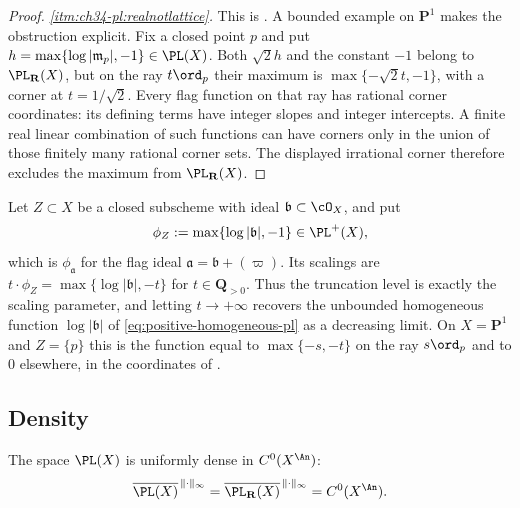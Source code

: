 \begin{proof}
\emph{\cref{itm:ch34-pl:realnotlattice}.}  This is
\cite[Remark~2.4]{BJ22}.  A bounded example on $\mathbf P^1$ makes the
obstruction explicit.  Fix a closed point $p$ and put
$h=\max\{\log|\mathfrak m_p|,-1\}\in\PL(X)$.
Both $\sqrt2h$ and the constant $-1$ belong to $\PL_{\mathbf R}(X)$,
but on the ray $t\ord_p$ their maximum is
$\max\{-\sqrt2t,-1\}$, with a corner at $t=1/\sqrt2$.
Every flag function on that ray has rational corner coordinates:
its defining terms have integer slopes and integer intercepts.
A finite real linear combination of such functions can have corners
only in the union of those finitely many rational corner sets.
The displayed irrational corner therefore excludes the maximum from
$\PL_{\mathbf R}(X)$.
\end{proof}

\begin{example}
\label{ex:ch34-pl-subscheme}
Let $Z\subset X$ be a closed subscheme with ideal
$\mathfrak b\subset\cO_X$, and put
\begin{equation}
\label{eq:ch34-phi-Z}
 \phi_Z:=\max\{\log|\mathfrak b|,-1\}\in\PL^+(X),
\end{equation}
which is $\phi_{\mathfrak a}$ for the flag ideal
$\mathfrak a=\mathfrak b+(\varpi)$.  Its scalings are
$t\cdot\phi_Z=\max\{\log|\mathfrak b|,-t\}$ for $t\in\mathbf Q_{>0}$.
Thus the truncation level is exactly the scaling parameter, and letting
$t\to+\infty$ recovers the unbounded homogeneous function
$\log|\mathfrak b|$ of \eqref{eq:positive-homogeneous-pl} as a decreasing
limit.  On $X=\mathbf P^1$ and $Z=\{p\}$ this is the function equal to
$\max\{-s,-t\}$ on the ray $s\ord_p$ and to $0$ elsewhere, in the
coordinates of .
\end{example}

\subsection{Density}

\begin{theorem}
\label{thm:ch34-pl-density}
The space $\PL(X)$ is uniformly dense in $C^0(X^{\An})$:
\begin{equation}
\label{eq:pl-stone-weierstrass}
 \overline{\PL(X)}^{\,\|\cdot\|_\infty}
 =\overline{\PL_{\mathbf R}(X)}^{\,\|\cdot\|_\infty}
 =C^0(X^{\An}).
\end{equation}
\end{theorem}

